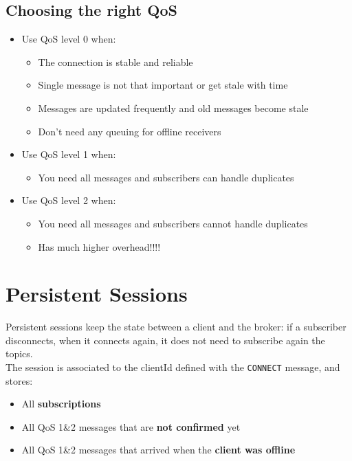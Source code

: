 \subsection{Choosing the right QoS}
\begin{itemize}
   \item Use QoS level 0 when:
   \begin{itemize}
      \item The connection is stable and reliable
      \item Single message is not that important or get stale with
      time
      \item Messages are updated frequently and old messages
      become stale
      \item Don’t need any queuing for offline receivers
   \end{itemize}
      \item Use QoS level 1 when:
   \begin{itemize}
      \item You need all messages and subscribers can handle
      duplicates
   \end{itemize}
   \item Use QoS level 2 when:
   \begin{itemize}
      \item You need all messages and subscribers cannot handle
      duplicates
      \item Has much higher overhead!!!!
   \end{itemize}
\end{itemize}

\section{Persistent Sessions}
Persistent sessions keep the state between a client and the broker:
if a subscriber disconnects, when it connects again, it does not need to subscribe again the topics.\\
The session is associated to the clientId defined with the \texttt{CONNECT} message, and stores:
\begin{itemize}
   \item All \textbf{subscriptions}
   \item All QoS 1\&2 messages that are \textbf{not confirmed} yet
   \item All QoS 1\&2 messages that arrived when the \textbf{client was
   offline}
\end{itemize}

